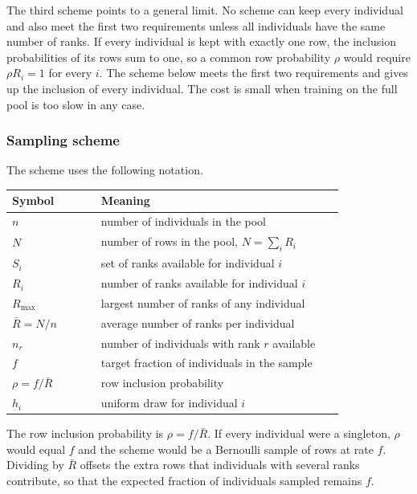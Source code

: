 \documentclass[11pt]{article}
\begin{document}
The third scheme points to a general limit. No scheme can keep every individual and also meet the first two requirements unless all individuals have the same number of ranks. If every individual is kept with exactly one row, the inclusion probabilities of its rows sum to one, so a common row probability $\rho$ would require $\rho R_i = 1$ for every $i$. The scheme below meets the first two requirements and gives up the inclusion of every individual. The cost is small when training on the full pool is too slow in any case.

\subsubsection*{Sampling scheme}

The scheme uses the following notation.

\begin{center}
\small
\begin{tabular}{@{}>{\raggedright\arraybackslash}p{0.22\linewidth} >{\raggedright\arraybackslash}p{0.60\linewidth}@{}}
\toprule
Symbol & Meaning \\
\midrule
$n$ & number of individuals in the pool \\
$N$ & number of rows in the pool, $N = \sum_i R_i$ \\
$S_i$ & set of ranks available for individual $i$ \\
$R_i$ & number of ranks available for individual $i$ \\
$R_{\max}$ & largest number of ranks of any individual \\
$\bar{R} = N / n$ & average number of ranks per individual \\
$n_r$ & number of individuals with rank $r$ available \\
$f$ & target fraction of individuals in the sample \\
$\rho = f / \bar{R}$ & row inclusion probability \\
$h_i$ & uniform draw for individual $i$ \\
\bottomrule
\end{tabular}
\end{center}

The row inclusion probability is $\rho = f / \bar{R}$. If every individual were a singleton, $\rho$ would equal $f$ and the scheme would be a Bernoulli sample of rows at rate $f$. Dividing by $\bar{R}$ offsets the extra rows that individuals with several ranks contribute, so that the expected fraction of individuals sampled remains $f$.
\end{document}

